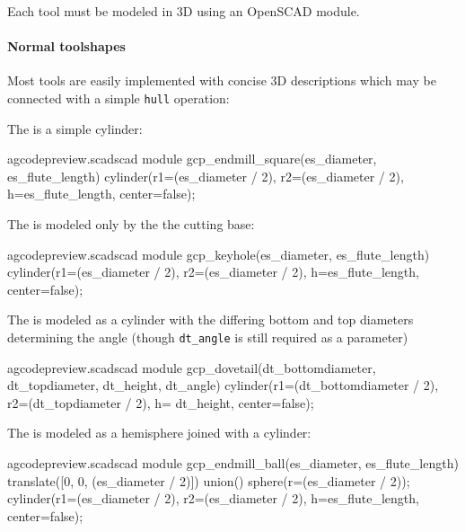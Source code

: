 \documentclass{ltxdoc}
\begin{document}
Each tool must be modeled in 3D using an OpenSCAD module. 

\paragraph{Normal toolshapes}
Most tools are easily implemented with concise 3D descriptions which may be connected with
a simple \texttt{hull} operation:

The  is a simple cylinder:
\lstset{firstnumber=\thegcpscad}
\begin{writecode}{a}{gcodepreview.scad}{scad}
module gcp_endmill_square(es_diameter, es_flute_length) {
  cylinder(r1=(es_diameter / 2), r2=(es_diameter / 2), h=es_flute_length, center=false);
}

\end{writecode}
\addtocounter{gcpscad}{4}

\begin{samepage}
The  is modeled only by the the cutting base:
\lstset{firstnumber=\thegcpscad}
\begin{writecode}{a}{gcodepreview.scad}{scad}
module gcp_keyhole(es_diameter, es_flute_length) {
  cylinder(r1=(es_diameter / 2), r2=(es_diameter / 2), h=es_flute_length, center=false);
}

\end{writecode}
\addtocounter{gcpscad}{4}
\end{samepage}

The  is modeled as a cylinder with the differing bottom and 
top diameters determining the angle (though \verb|dt_angle| is still required 
as a parameter)
\lstset{firstnumber=\thegcpscad}
\begin{writecode}{a}{gcodepreview.scad}{scad}
module gcp_dovetail(dt_bottomdiameter, dt_topdiameter, dt_height, dt_angle) {
  cylinder(r1=(dt_bottomdiameter / 2), r2=(dt_topdiameter / 2), h= dt_height, center=false);
}

\end{writecode}
\addtocounter{gcpscad}{4}

The  is modeled as a hemisphere joined with a cylinder:
\lstset{firstnumber=\thegcpscad}
\begin{writecode}{a}{gcodepreview.scad}{scad}
module gcp_endmill_ball(es_diameter, es_flute_length) {
  translate([0, 0, (es_diameter / 2)]){
    union(){
      sphere(r=(es_diameter / 2));
      cylinder(r1=(es_diameter / 2), r2=(es_diameter / 2), h=es_flute_length, center=false);
    }
  }
}

\end{writecode}
\addtocounter{gcpscad}{9}
\end{document}
